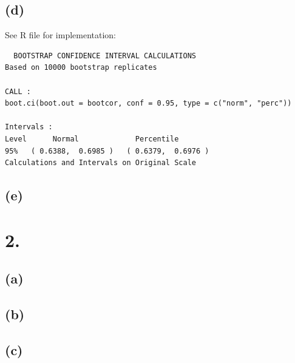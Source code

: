 \documentclass{article}
\begin{document}
{\subsection*{(d)}

See R file for implementation: \\ 
\begin{verbatim}
  BOOTSTRAP CONFIDENCE INTERVAL CALCULATIONS
Based on 10000 bootstrap replicates

CALL : 
boot.ci(boot.out = bootcor, conf = 0.95, type = c("norm", "perc"))

Intervals : 
Level      Normal             Percentile     
95%   ( 0.6388,  0.6985 )   ( 0.6379,  0.6976 )  
Calculations and Intervals on Original Scale
\end{verbatim}

\subsection*{(e)}



}

\section*{2.}
{\Large

\subsection*{(a)}



\subsection*{(b)}



\subsection*{(c)}



}
\end{document}
